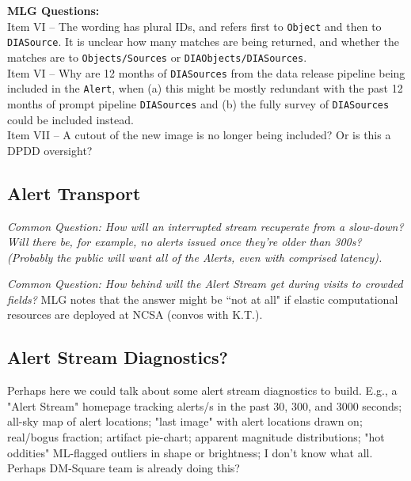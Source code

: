 {\bf MLG Questions:} \\
Item VI -- The wording has plural IDs, and refers first to {\tt Object} and then to {\tt DIASource}. It is unclear how many matches are being returned, and whether the matches are to {\tt Objects/Sources} or {\tt DIAObjects/DIASources}. \\
Item VI -- Why are 12 months of {\tt DIASources} from the data release pipeline being included in the {\tt Alert}, when (a) this might be mostly redundant with the past 12 months of prompt pipeline {\tt DIASources} and (b) the fully survey of {\tt DIASources} could be included instead. \\
Item VII -- A cutout of the new image is no longer being included? Or is this a DPDD oversight?


\subsection{Alert Transport}

{\it Common Question: How will an interrupted stream recuperate from a slow-down? Will there be, for example, no alerts issued once they're older than 300s? (Probably the public will want all of the Alerts, even with comprised latency).}

{\it Common Question: How behind will the Alert Stream get during visits to crowded fields?} MLG notes that the answer might be ``not at all" if elastic computational resources are deployed at NCSA (convos with K.T.).


\subsection{Alert Stream Diagnostics?}

Perhaps here we could talk about some alert stream diagnostics to build. E.g., a "Alert Stream" homepage tracking alerts/s in the past 30, 300, and 3000 seconds; all-sky map of alert locations; "last image" with alert locations drawn on; real/bogus fraction; artifact pie-chart; apparent magnitude distributions; "hot oddities" ML-flagged outliers in shape or brightness; I don't know what all. Perhaps DM-Square team is already doing this?


